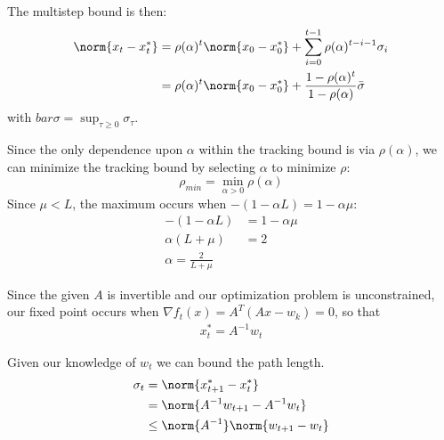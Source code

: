 \documentclass{homework}
\begin{document}
\begin{letterenum}
The multistep bound is then:
\begin{align}
    \norm{x_t - x_t^*} &= \rho(\alpha)^t \norm{x_0 - x_0^*} +
        \sum_{i=0}^{t-1} \rho(\alpha)^{t-i-1}\sigma_i \\
        &= \rho(\alpha)^t \norm{x_0 - x_0^*} + \frac{1 - \rho(\alpha)^t}{1-\rho(\alpha)} \bar{\sigma}
        \label{eq:multistep-bound-alg}
\end{align}
with $bar{\sigma} = \sup_{\tau \geq 0} \sigma_\tau$.

Since the only dependence upon $\alpha$ within the tracking bound is via
$\rho(\alpha)$, we can minimize the tracking bound by selecting $\alpha$ to
minimize $\rho$:
\begin{equation*}
    \rho_{min} = \min_{\alpha > 0} \rho(\alpha)
\end{equation*}
Since $\mu < L$, the maximum occurs when $-(1-\alpha L) = 1 - \alpha \mu$:
\begin{align*}
    -(1 - \alpha L) &= 1 - \alpha \mu \\
    \alpha (L + \mu) &= 2  \\
    \alpha = \frac{2}{L + \mu}
\end{align*}

 Since the given
$A$ is invertible and our optimization problem is unconstrained, our
fixed point occurs when $\nabla f_t(x) = A^T(Ax - w_k) = 0$, so that
\begin{align*}
    x_t^* = A^{-1} w_t
\end{align*}

Given our knowledge of $w_t$ we can bound the path length.
\begin{align}
    \sigma_t &= \norm{x_{t+1}^* - x_t^*}  \\
        &= \norm{A^{-1} w_{t+1} - A^{-1} w_t} \\
        &\leq \norm{A^{-1}} \norm{w_{t+1} - w_t}
        \label{eq:norm}
\end{align}


\end{letterenum}
\end{document}

